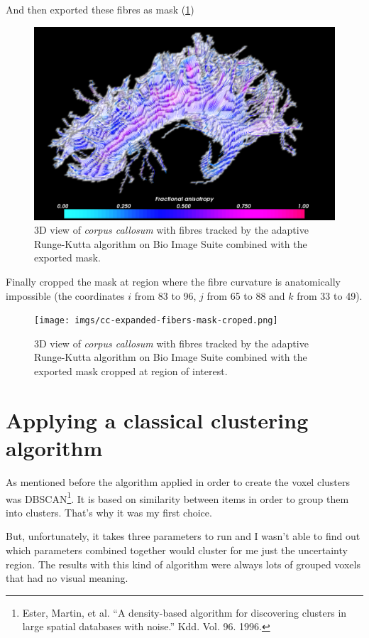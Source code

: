 \documentclass[a4paper,11pt]{report}
\begin{document}
  And then exported these fibres as mask (\ref{fig:fibres-mask})

  \begin{figure}[H]
    \includegraphics[width=1\linewidth]{imgs/cc-expanded-fibers-mask.png}
    \caption{3D view of \textit{corpus callosum} with fibres tracked by the adaptive Runge-Kutta algorithm on Bio Image Suite combined with the exported mask.}
    \label{fig:fibres-mask}
  \end{figure}

  Finally cropped the mask at region where the fibre curvature is anatomically impossible (the coordinates $i$ from 83 to 96, $j$ from 65 to 88 and $k$ from 33 to 49).

  \begin{figure}[H]
    \texttt{[image: imgs/cc-expanded-fibers-mask-croped.png]}
    \caption{3D view of \textit{corpus callosum} with fibres tracked by the adaptive Runge-Kutta algorithm on Bio Image Suite combined with the exported mask cropped at region of interest.}
    \label{fig:fibres-mask-croped}
  \end{figure}

  \section{Applying a classical clustering algorithm}
  As mentioned before the algorithm applied in order to create the voxel clusters was DBSCAN\footnote{Ester, Martin, et al. ``A density-based algorithm for discovering clusters in large spatial databases with noise.'' Kdd. Vol. 96. 1996.}. It is based on similarity between items in order to group them into clusters. That's why it was my first choice.

  But, unfortunately, it takes three parameters to run and I wasn't able to find out which parameters combined together would cluster for me just the uncertainty region. The results with this kind of algorithm were always lots of grouped voxels that had no visual meaning.
\end{document}
